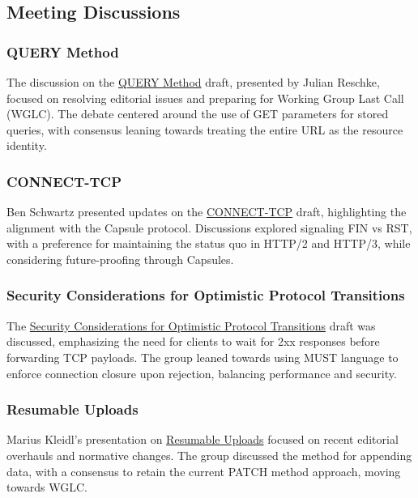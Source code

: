 \documentclass{article}
\begin{document}
\subsection{Meeting Discussions}

\subsubsection{QUERY Method}
The discussion on the \href{https://datatracker.ietf.org/doc/html/draft-ietf-httpbis-safe-method-w-body}{QUERY Method} draft, presented by Julian Reschke, focused on resolving editorial issues and preparing for Working Group Last Call (WGLC). The debate centered around the use of GET parameters for stored queries, with consensus leaning towards treating the entire URL as the resource identity.

\subsubsection{CONNECT-TCP}
Ben Schwartz presented updates on the \href{https://datatracker.ietf.org/doc/html/draft-ietf-httpbis-connect-tcp}{CONNECT-TCP} draft, highlighting the alignment with the Capsule protocol. Discussions explored signaling FIN vs RST, with a preference for maintaining the status quo in HTTP/2 and HTTP/3, while considering future-proofing through Capsules.

\subsubsection{Security Considerations for Optimistic Protocol Transitions}
The \href{https://datatracker.ietf.org/doc/html/draft-ietf-httpbis-optimistic-upgrade}{Security Considerations for Optimistic Protocol Transitions} draft was discussed, emphasizing the need for clients to wait for 2xx responses before forwarding TCP payloads. The group leaned towards using MUST language to enforce connection closure upon rejection, balancing performance and security.

\subsubsection{Resumable Uploads}
Marius Kleidl's presentation on \href{https://datatracker.ietf.org/doc/html/draft-ietf-httpbis-resumable-upload}{Resumable Uploads} focused on recent editorial overhauls and normative changes. The group discussed the method for appending data, with a consensus to retain the current PATCH method approach, moving towards WGLC.
\end{document}
